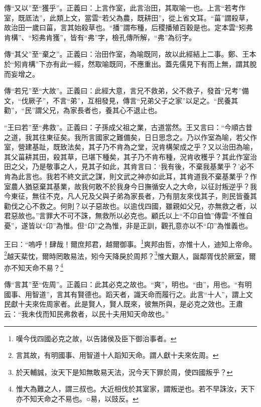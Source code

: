 {\noindent\zhuan{}\fzbyks 傳“又以”至“獲乎”。正義曰：上言作室，此言治田，其取喻一也。上言“若考作室，既厎法”，此類上文，當雲“若父為農，既耕田”，從上省文耳。“菑”謂殺草，故治田一歲曰菑，言其始殺草也。“播”謂布種，后稷播殖百穀是也。定本雲“矧弗肯構”、“矧弗肯獲”，皆有“弗”字，檢孔傳所解，“弗”為衍字。 \par}

{\noindent\zhuan{}\fzbyks 傳“其父”至“棄之”。正義曰：治田作室，為喻既同，故以此經結上二事。鄭、王本於“矧肯構”下亦有此一經，然取喻既同，不應重出。蓋先儒見下有而上無，謂其脫而妄增之。 \par}

{\noindent\zhuan{}\fzbyks 傳“若兄”至“大故”。正義曰：此經大意，言兄不救弟，父不救子，發首“兄考”備文，“伐厥子”，不言“弟”，互相發見，傳言“兄弟父子之家”以足之。“民養其勸”，“民”謂父兄，為家長者也，養其心不退止也。 \par}

{\noindent\shu{}\fzkt “王曰若”至“弗救”。正義曰：子孫成父祖之業，古道當然。王又言曰：“今順古昔之道，我其往東征矣。我所言國家之難備矣，日日思念之。乃以作室為喻，若父作室，營建基趾，既致法矣，其子乃不肯為之堂，況肯構架成之乎？又以治田為喻，其父菑耕其田，殺其草，已堪下種矣，其子乃不肯布種，況肯收穫乎？其此作室治田之父，乃是敬事之人，見其子如此，其肯言曰：‘我有後，不棄我基業乎？’必不肯為此言也。我若不終文武之謀，則文武之神亦如此耳，其肯道我不棄基業乎？作室農人猶惡棄其基業，故我何敢不於我身今日撫循安人之大命，以征討叛逆乎？我今東征，無往不克，凡人兄及父與子弟為家長者，乃有朋友來伐其子，則民皆養其勸伐之心不救之。何則？以子惡故也。以逾伐四國，雖親如父兄，亦無救之者，以君惡故也。”言罪大不可不誅，無救所以必克也。顧氏以上“不卬自恤”傳雲“不惟自憂”，遂皆以“卬”為惟。但“卬”之為惟，非是正訓，觀孔意亦以不“卬”為惟義也。 \par}

王曰：“嗚呼！肆哉！爾庶邦君，越爾御事。\footnote{嘆今伐四國必克之故，以告諸侯及臣下御治事者。}爽邦由哲，亦惟十人，迪知上帝命。\footnote{言其故，有明國事、用智道十人蹈知天命。謂人獻十夫來佐周。}越天棐忱，爾時罔敢易法，矧今天降戾於周邦？\footnote{於天輔誠，汝天下是知無敢易天法，況今天下罪於周，使四國叛乎？}惟大艱人，誕鄰胥伐於厥室，爾亦不知天命不易？\footnote{惟大為難之人，謂三叔也。大近相伐於其室家，謂叛逆也。若不早誅汝，天下亦不知天命之不易也。○易，以豉反。}


{\noindent\zhuan{}\fzbyks 傳“言其”至“佐周”。正義曰：此其必克之故也。“爽”，明也。“由”，用也。“有明國事、用智道”，言其有賢德也。蹈天者，識天命而履行之。此言“十人”，謂上文民獻十夫來佐周家者。此是賢人，賢人既來，彼無所與，是必克之效也。王肅云：“我未伐而知民弗救者，以民十夫用知天命故也。” \par}

